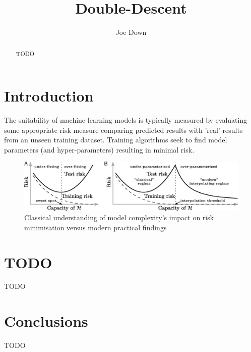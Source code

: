 \documentclass[]{article}
\title{Double-Descent}
\author{Joe Down}
\date{}
\begin{document}
\maketitle

\begin{abstract}
TODO
\end{abstract}

\section{Introduction}
The suitability of machine learning models is typically measured by evaluating some appropriate risk measure comparing predicted results with 'real' results from an unseen training dataset\cite{}. Training algorithms seek to find model parameters (and hyper-parameters) resulting in minimal risk.\\
\begin{figure}[h]
\includegraphics[width=\textwidth]{pnas.1903070116fig01}
\centering
\caption{Classical understanding of model complexity's impact on risk minimisation versus modern practical findings\cite{belkin2019reconciling}}
\label{figure:double_descent}
\end{figure}

\section{TODO}
TODO

\section{Conclusions}
TODO



\end{document}
